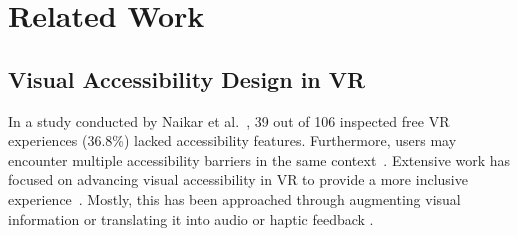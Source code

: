 \section{Related Work}
\subsection{Visual Accessibility Design in VR}

In a study conducted by Naikar et al.~\cite{naikar2024accessibility}, 39 out of 106 inspected free VR experiences (36.8\%) lacked accessibility features. Furthermore, users may encounter multiple accessibility barriers in the same context~\cite{creed2024inclusive}. Extensive work has focused on advancing visual accessibility %
in VR to provide a more inclusive experience~\cite{dudley2023inclusive}. Mostly, this has been approached through augmenting visual information \cite{zhao2019seeingvr, masnadi2020vriassist, teofilo2018evaluating} or translating it into audio or haptic feedback \cite{canetroller, kim2020vivr, zhao2019seeingvr, ji2022vrbubble}. 


